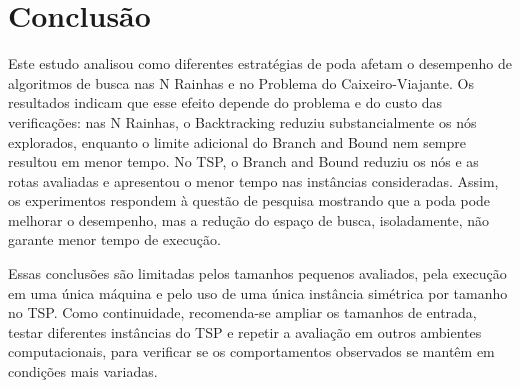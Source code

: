\documentclass[12pt]{article}
\begin{document}
\section{Conclusão}

Este estudo analisou como diferentes estratégias de poda afetam o desempenho de algoritmos de busca nas N Rainhas e no Problema do Caixeiro-Viajante. Os resultados indicam que esse efeito depende do problema e do custo das verificações: nas N Rainhas, o Backtracking reduziu substancialmente os nós explorados, enquanto o limite adicional do Branch and Bound nem sempre resultou em menor tempo. No TSP, o Branch and Bound reduziu os nós e as rotas avaliadas e apresentou o menor tempo nas instâncias consideradas. Assim, os experimentos respondem à questão de pesquisa mostrando que a poda pode melhorar o desempenho, mas a redução do espaço de busca, isoladamente, não garante menor tempo de execução.

Essas conclusões são limitadas pelos tamanhos pequenos avaliados, pela execução em uma única máquina e pelo uso de uma única instância simétrica por tamanho no TSP. Como continuidade, recomenda-se ampliar os tamanhos de entrada, testar diferentes instâncias do TSP e repetir a avaliação em outros ambientes computacionais, para verificar se os comportamentos observados se mantêm em condições mais variadas.

\nocite{laaksonen:2018,haralick:1980,cormen:2012,little:1963}


\end{document}
